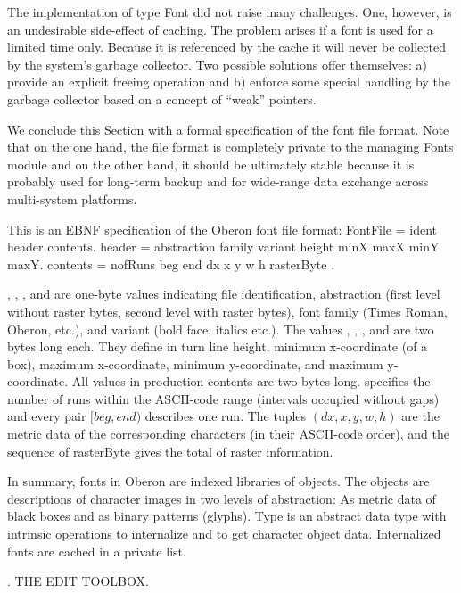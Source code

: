 The implementation of type Font did not raise many challenges. One, however, is an undesirable side-effect of caching. The problem arises if a font is used for a limited time only. Because it is referenced by the cache it will never be collected by the system's garbage collector. Two possible solutions offer themselves: a) provide an explicit freeing operation and b) enforce some special handling by the garbage collector based on a concept of ``weak'' pointers.

We conclude this Section with a formal specification of the font file format. Note that on the one hand, the file format is completely private to the managing Fonts module and on the other hand, it should be ultimately stable because it is probably used for long-term backup and for wide-range data exchange across multi-system platforms.

This is an EBNF specification of the Oberon font file format:
\begintt
FontFile = ident header contents.
header = abstraction family variant height minX maxX minY maxY.
contents = nofRuns { beg end } { dx x y w h } { rasterByte }.
\endtt

\noindent {}, , , and  are one-byte values indicating file identification, abstraction (first level without raster bytes, second level with raster bytes), font family (Times Roman, Oberon, etc.), and variant (bold face, italics etc.). The values , , ,  and  are two bytes long each. They define in turn line height, minimum x-coordinate (of a box), maximum x-coordinate, minimum y-coordinate, and maximum y-coordinate. All values in production contents are two bytes long.  specifies the number of runs within the ASCII-code range (intervals occupied without gaps) and every pair $[beg, end)$ describes one run. The tuples $(dx, x, y, w, h)$ are the metric data of the corresponding characters (in their ASCII-code order), and the sequence of rasterByte gives the total of raster information.

In summary, fonts in Oberon are indexed libraries of objects. The objects are descriptions of character images in two levels of abstraction: As metric data of black boxes and as binary patterns (glyphs). Type  is an abstract data type with intrinsic operations to internalize and to get character object data. Internalized fonts are cached in a private list.

. THE EDIT TOOLBOX.

